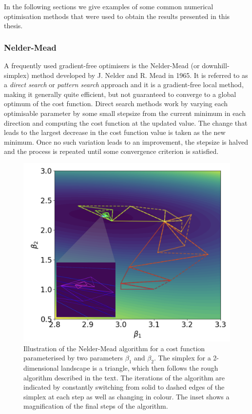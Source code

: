 In the following sections we give examples of some common numerical optimisation methods that were used to obtain the results presented in this thesis.

\subsubsection{Nelder-Mead}\label{sec:3.1.3.1_Nelder_Mead}

A frequently used gradient-free optimisers is the Nelder-Mead (or downhill-simplex) method \cite{nelder_simplex_1965} developed by J. Nelder and R. Mead in 1965. It is referred to as a \emph{direct search} or \emph{pattern search} approach and it is a gradient-free local method, making it generally quite efficient, but not guaranteed to converge to a global optimum of the cost function. Direct search methods work by varying each optimisable parameter by some small stepsize from the current minimum in each direction and computing the cost function at the updated value. The change that leads to the largest decrease in the cost function value is taken as the new minimum. Once no such variation leads to an improvement, the stepsize is halved and the process is repeated until some convergence criterion is satisfied.

\begin{figure}[t]
\centering
\includegraphics[width=0.6\linewidth]{images/nelder_mead_illustration.png} \caption[Visualising the Nelder-Mead optimisation algorithm.]{Illustration of the Nelder-Mead algorithm for a cost function parameterised by two parameters $\beta_1$ and $\beta_2$. The simplex for a 2-dimensional landscape is a triangle, which then follows the rough algorithm described in the text. The iterations of the algorithm are indicated by constantly switching from solid to dashed edges of the simplex at each step as well as changing in colour. The inset shows a magnification of the final steps of the algorithm.}\label{fig:nelder_mead}
\end{figure}

